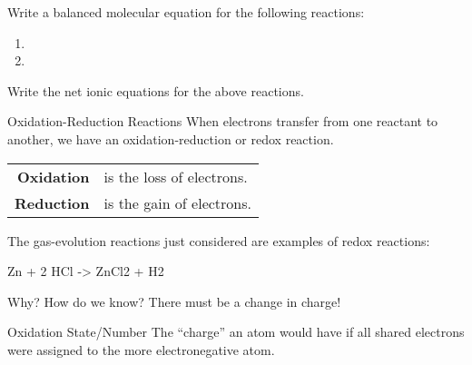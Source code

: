 \documentclass[11pt,letterpaper]{article}
\begin{document}

\begin{onyourown}
	Write a balanced molecular equation for the following reactions:

	\begin{enumerate}
		\item {}
			\vspace{5em}
		\item {}
			\vspace{5em}
	\end{enumerate}

	Write the net ionic equations for the above reactions.
\end{onyourown}

\clearpage

\begin{frame}{Oxidation-Reduction Reactions}
	When electrons transfer from one reactant to another, we have an
	\alert{oxidation-reduction} or \alert{redox} reaction.
	\begin{center}
		\begin{tabular} {>{\bfseries}r@{~}l}
			Oxidation & is the \alert{loss} of electrons. \\
			Reduction & is the \alert{gain} of electrons.
		\end{tabular}
	\end{center}

	\pause

	\medskip

	The gas-evolution reactions just considered are examples of redox
	reactions:
	\begin{reaction*}
		Zn\sld{} + 2 HCl\aq{} -> ZnCl2\aq{} + H2\gas{}
	\end{reaction*}

	\pause

	\begin{center}
		Why? How do we know?
		\pause
		There \alert{must} be a change in charge!
	\end{center}

	\begin{block}{Oxidation State/Number}
		The ``charge'' an atom would have if all shared electrons were
		assigned to the more electronegative atom.
	\end{block}
\end{frame}

\end{document}
